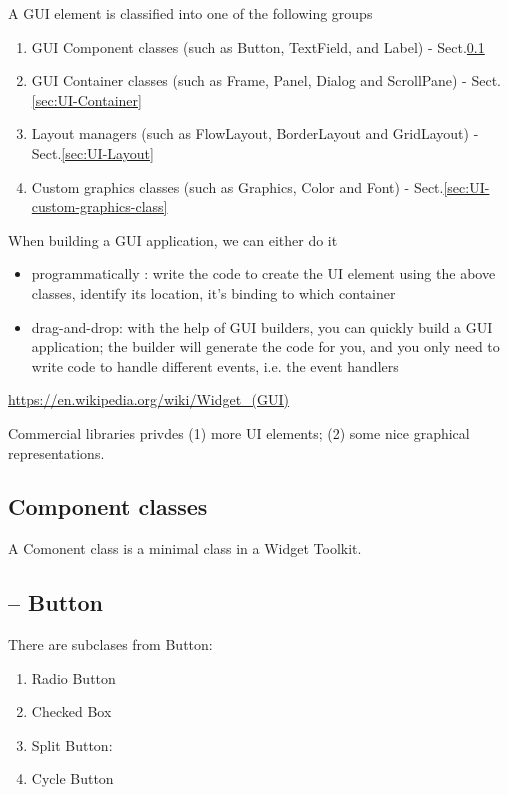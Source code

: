 A GUI element is classified into one of the following groups
\begin{enumerate}
  \item GUI Component classes (such as Button, TextField, and Label) -
  Sect.\ref{sec:UI-Component}
  
  \item GUI Container classes (such as Frame, Panel, Dialog and ScrollPane) -
  Sect.\ref{sec:UI-Container}
   
  \item Layout managers (such as FlowLayout, BorderLayout and GridLayout) -
  Sect.\ref{sec:UI-Layout}
   
  \item Custom graphics classes (such as Graphics, Color and Font) - 
  Sect.\ref{sec:UI-custom-graphics-class}
 
\end{enumerate} 


When building a GUI application, we can either do it
\begin{itemize}
  \item programmatically : write the code to create the UI element using the
  above classes, identify its location, it's binding to which container
  
  
  \item drag-and-drop: with the help of GUI builders, you can quickly build a
  GUI application; the builder will generate the code for you, and you only need
  to write code to handle different events, i.e. the event handlers
\end{itemize}
\url{https://en.wikipedia.org/wiki/Widget_(GUI)}

Commercial libraries privdes (1) more UI elements; (2) some nice graphical
representations.

\subsection{Component classes}
\label{sec:UI-Component}

A Comonent class is a minimal class in a Widget Toolkit.

\subsection{-- Button}

There are subclases from Button:
\begin{enumerate}
  \item Radio Button
  
  \item Checked Box
  
  \item Split Button: 
  
  \item Cycle Button
\end{enumerate}

